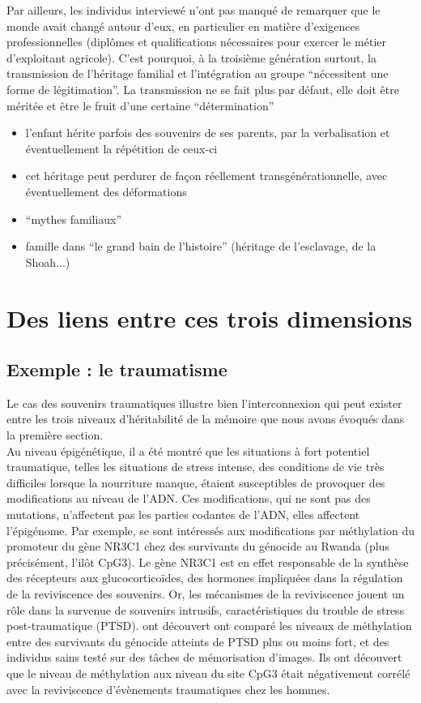 \documentclass[french]{article}
\begin{document}
			Par ailleurs, les individus interviewé n'ont pas manqué de remarquer que le monde avait changé autour d'eux, en particulier en matière d'exigences professionnelles (diplômes et qualifications nécessaires pour exercer le métier d'exploitant agricole). C'est pourquoi, à la troisième génération surtout, la transmission de l'héritage familial et l'intégration au groupe ``nécessitent une forme de légitimation''. La transmission ne se fait plus par défaut, elle doit être méritée et être le fruit  d'une certaine ``détermination''
		
		
			
			
			
		\begin{itemize}
			\item l'enfant hérite parfois des souvenirs de ses parents, par la verbalisation et éventuellement la répétition de ceux-ci
			\item cet héritage peut perdurer de façon réellement transgénérationnelle, avec éventuellement des déformations
			\item ``mythes familiaux''
			\item famille dans ``le grand bain de l'histoire'' (héritage de l'esclavage, de la Shoah...)
		\end{itemize}
	\section{Des liens entre ces trois dimensions}
		\subsection{Exemple : le traumatisme}
			Le cas des souvenirs traumatiques illustre bien l'interconnexion qui peut exister entre les trois niveaux d'héritabilité de la mémoire que nous avons évoqués dans la première section.\\
			
			Au niveau épigénétique, il a été montré que les situations à fort potentiel traumatique, telles les situations de stress intense, des conditions de vie très difficiles lorsque la nourriture manque, étaient susceptibles de provoquer des modifications au niveau de l'ADN. Ces modifications, qui ne sont pas des mutations, n'affectent pas les parties codantes de l'ADN, elles affectent l'épigénome. Par exemple, \cite{vukojevic2014} se sont intéressés aux modifications par méthylation du promoteur du gène NR3C1 chez des survivants du génocide au Rwanda (plus précisément, l'ilôt CpG3). Le gène NR3C1 est en effet responsable de la synthèse des récepteurs aux glucocorticoïdes, des hormones impliquées dans la régulation de la reviviscence des souvenirs. Or, les mécanismes de la reviviscence jouent un rôle dans la survenue de souvenirs intrusifs, caractéristiques du trouble de stress post-traumatique (PTSD). \cite{vukojevic2014} ont découvert ont comparé les niveaux de méthylation entre des survivants du génocide atteints de PTSD plus ou moins fort, et des individus sains testé sur des tâches de mémorisation d'images. Ils ont découvert que le niveau de méthylation aux niveau du site CpG3 était négativement corrélé avec la reviviscence d'évènements traumatiques chez les hommes.\\
			
\end{document}
